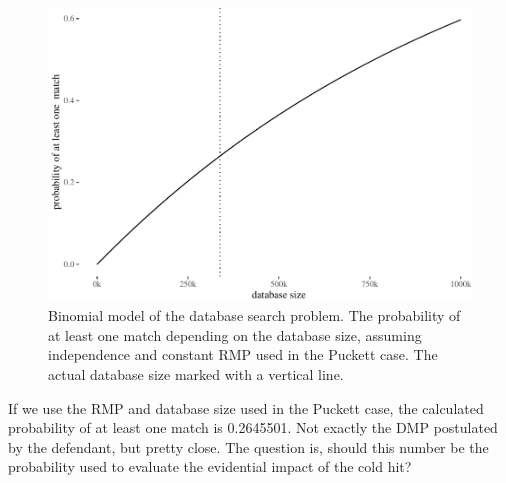 \documentclass[10pt,dvipsnames,enabledeprecatedfontcommands]{scrartcl}
\begin{document}
\begin{figure}

{\centering \includegraphics[width=0.8\linewidth]{lr-chapter_files/figure-latex/unnamed-chunk-4-1} 

}

\caption{Binomial model of the database search problem. The probability of at least one match depending on the database size, assuming independence and constant RMP used in  the Puckett case. The actual database size marked with a vertical line.}\label{fig:unnamed-chunk-4}
\end{figure}

If we use the RMP and database size used in the Puckett case, the
calculated probability of at least one match is 0.2645501. Not exactly
the DMP postulated by the defendant, but pretty close. The question is,
should this number be the probability used to evaluate the evidential
impact of the cold hit?
\end{document}
